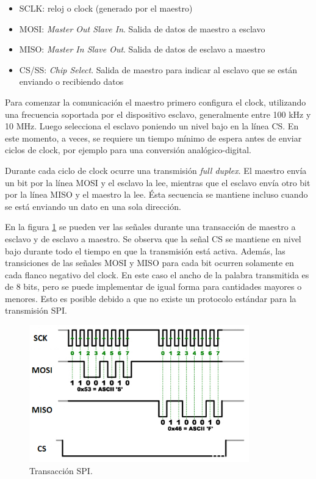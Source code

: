 \begin{itemize}
\item SCLK: reloj o clock (generado por el maestro)
\item MOSI: \textit{Master Out Slave In}. Salida de datos de maestro a esclavo
\item MISO: \textit{Master In Slave Out}. Salida de datos de esclavo a maestro
\item CS/SS: \textit{Chip Select}. Salida de maestro para indicar al esclavo que se están enviando o recibiendo datos
\end{itemize}

Para comenzar la comunicación el maestro primero configura el clock, utilizando una frecuencia soportada por el dispositivo esclavo, generalmente entre 100 kHz y 10 MHz. Luego selecciona el esclavo poniendo un nivel bajo en la línea CS. En este momento, a veces, se requiere un tiempo mínimo de espera antes de enviar ciclos de clock, por ejemplo para una conversión analógico-digital.

Durante cada ciclo de clock ocurre una transmisión \textit{full duplex}. El maestro envía un bit por la línea MOSI y el esclavo la lee, mientras que el esclavo envía otro bit por la línea MISO y el maestro la lee. Ésta secuencia se mantiene incluso cuando se está enviando un dato en una sola dirección.

En la figura \ref{fig:transSPI} se pueden ver las señales durante una transacción de maestro a esclavo y de esclavo a maestro. Se observa que la señal CS se mantiene en nivel bajo durante todo el tiempo en que la transmisión está activa. Además, las transiciones de las señales MOSI y MISO para cada bit ocurren solamente en cada flanco negativo del clock. En este caso el ancho de la palabra transmitida es de 8 bits, pero se puede implementar de igual forma para cantidades mayores o menores. Esto es posible debido a que no existe un protocolo estándar para la transmisión SPI.

\begin{figure}[H]
\centering
\includegraphics[width=0.85\textwidth]{./Figures/SPItrans.png}
\caption{Transacción SPI.}
\label{fig:transSPI}
\end{figure}

